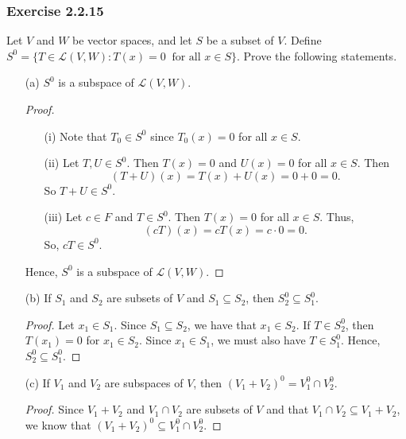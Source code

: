 \subsubsection{Exercise 2.2.15} Let \( V  \) and \( W  \) be vector spaces, and let \( S  \) be a subset of \( V  \). Define \( S^{0} = \{ T \in \mathcal{L}(V,W) : T(x) = 0 \ \text{ for all } x \in S  \}  \). Prove the following statements.
\begin{enumerate}
    \item[(a)] \( S^{0}  \) is a subspace of \( \mathcal{L}(V,W) \).
        \begin{proof}
        \begin{enumerate}
            \item[(i)] Note that \( {T}_{0} \in S^{0} \) since \( {T}_{0}(x) = 0  \) for all \( x \in S  \).
            \item[(ii)] Let \( T, U \in S^{0} \). Then \( T(x) = 0  \) and \( U(x) = 0  \) for all \( x \in S  \). Then 
                \[ (T+U)(x) = T(x) + U(x) = 0 + 0 = 0. \]
                So \( T + U \in S^{0} \).
            \item[(iii)] Let \( c \in F  \) and \( T \in S^{0} \). Then \( T(x) = 0  \) for all \( x \in S  \). Thus, 
                \[  (cT)(x) = c T(x) = c \cdot 0 = 0. \]
                So, \( cT \in S^{0} \).
        \end{enumerate} 
        Hence, \( S^{0} \) is a subspace of \( \mathcal{L}(V,W) \).
        \end{proof}
    \item[(b)] If \( {S}_{1} \) and \( {S}_{2} \) are subsets of \( V  \) and \( {S}_{1} \subseteq {S}_{2} \), then \( {S}_{2}^{0} \subseteq {S}_{1}^{0} \).
        \begin{proof}
        Let \( {x}_{1} \in {S}_{1} \). Since \( {S}_{1} \subseteq {S}_{2}  \), we have that \( {x}_{1} \in {S}_{2} \). If \( T \in {S}_{2}^{0}  \), then \( T({x}_{1}) = 0  \) for \( {x}_{1} \in {S}_{2} \). Since \( {x}_{1} \in {S}_{1} \), we must also have \( T \in {S}_{1}^{0}  \). Hence, \( {S}_{2}^{0} \subseteq {S}_{1}^{0}\).
        \end{proof}
    \item[(c)] If \( {V}_{1} \) and \( {V}_{2} \) are subspaces of \( V  \), then \( ({V}_{1} + {V}_{2})^{0} = {V}_{1}^{0} \cap V_{2}^{0} \).
        \begin{proof}
        Since \( {V}_{1} + {V}_{2}  \) and \( {V}_{1} \cap {V}_{2} \) are subsets of \( V  \) and that \(  {V}_{1} \cap {V}_{2} \subseteq {V}_{1} + {V}_{2}  \), we know that \( ({V}_{1} + {V}_{2})^{0} \subseteq {V}_{1}^{0} \cap {V}_{2}^{0} \).


\end{proof}
\end{enumerate}
